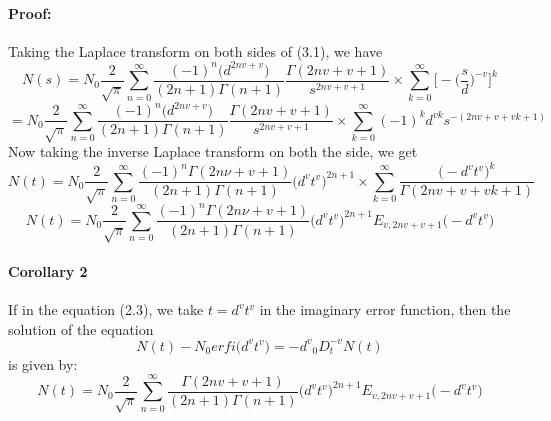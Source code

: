 \documentclass{article}
\begin{document}
\paragraph{Proof:}
Taking the Laplace transform on both sides of (3.1), we have\\ 
\begin{equation*}
    N(s)=N_0
    {\frac{2}{\sqrt{\pi}}}
    \sum_{n = 0}^{\infty}
    \frac{(-1)^n{\big(d^{2nv+v}\big)}}{(2n+1)\Gamma{(n+1)}}
    \frac{\Gamma{(2nv+v+1)}}{s^{2nv+v+1}}
    \times
    \sum_{k=0}^{\infty}
    \bigg[
        -{\bigg(\frac{s}{d}\bigg)^{-v}}
    \bigg]^k
\end{equation*}
\begin{equation*}
    =N_0
    {\frac{2}{\sqrt{\pi}}}
    \sum_{n = 0}^{\infty}
    \frac{(-1)^n{\big(d^{2nv+v}\big)}}{(2n+1)\Gamma{(n+1)}}
    \frac{\Gamma{(2nv+v+1)}}{s^{2nv+v+1}}
    \times
    \sum_{k=0}^{\infty}
    (-1)^k{d^{vk}}{s^{-(2nv+v+vk+1)}}
\end{equation*}
Now taking the inverse Laplace transform on both the side, we get
\begin{equation*}
    N(t) = N_0
    \frac{2}{\sqrt{\pi}}
    \sum_{n = 0}^{\infty}
    \frac{{(-1)^n}{\Gamma{(2n \nu +v+1)}}}{(2n+1)\Gamma{(n+1)}}
    \big({d^v}{t^v}\big)^{2n+1}
    \times
    \sum_{k=0}^{\infty}
    \frac{\big(-{d^v}{t^v}\big)^k}{\Gamma(2nv+v+vk+1)}
\end{equation*}
\begin{equation*}
    N(t) = N_0
    \frac{2}{\sqrt{\pi}}
    \sum_{n = 0}^{\infty}
    \frac{{(-1)^n}{\Gamma{(2n \nu +v+1)}}}{(2n+1)\Gamma{(n+1)}}
    \big({d^v}{t^v}\big)^{2n+1}
    E_{v,2nv+v+1}
    \big(-{d^v}{t^v}\big)
\end{equation*}
\paragraph{Corollary 2}
If in the equation (2.3), we take $t = {d^v}{t^v}$ in the imaginary error function, then the solution of the equation
\begin{equation}
    N(t) -{N_0}erfi\big({d^v}{t^v}\big)= {-d^v}{_0D_t^{-v}}N(t)
\end{equation}
is given by: 
\begin{equation}
    N(t) = N_0
    \frac{2}{\sqrt{\pi}}
    \sum_{n = 0}^{\infty}
    \frac{\Gamma{(2nv+v+1)}}{(2n+1)\Gamma{(n+1)}}
    \big({d^v}{t^v}\big)^{2n+1}
    E_{v,2nv+v+1}
    \big(-{d^v}{t^v}\big)
\end{equation}
\end{document}
